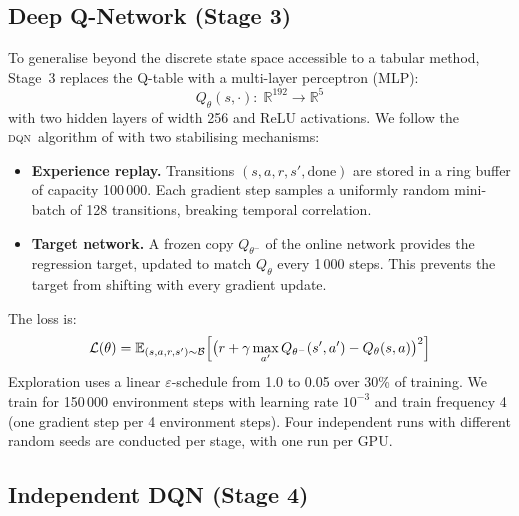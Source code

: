 \documentclass[12pt]{article}
\newcommand{\state}{s}
\newcommand{\action}{a}
\newcommand{\reward}{r}
\newcommand{\discount}{\gamma}
\newcommand{\DQN}{\textsc{dqn}}
\begin{document}
\subsection{Deep Q-Network (Stage 3)}
\label{sec:dqn}

To generalise beyond the discrete state space accessible to a tabular method,
Stage~3 replaces the Q-table with a multi-layer perceptron (MLP):
\begin{equation}
  Q_\theta(\state, \cdot):\; \mathbb{R}^{192} \to \mathbb{R}^5
\end{equation}
with two hidden layers of width 256 and ReLU activations.  We follow the
\DQN\ algorithm of \citet{mnih2015human} with two stabilising
mechanisms:
\begin{itemize}
  \item \textbf{Experience replay.} Transitions $(\state, \action, \reward,
        \state', \text{done})$ are stored in a ring buffer of capacity
        100\,000.  Each gradient step samples a uniformly random mini-batch of
        128 transitions, breaking temporal correlation.
  \item \textbf{Target network.} A frozen copy $Q_{\theta^-}$ of the online
        network provides the regression target, updated to match $Q_\theta$
        every 1\,000 steps.  This prevents the target from shifting with
        every gradient update.
\end{itemize}
The loss is:
\begin{equation}
  \mathcal{L}(\theta) = \mathbb{E}_{(\state,\action,\reward,\state') \sim
    \mathcal{B}} \Bigl[
    \bigl(\reward + \discount \max_{\action'} Q_{\theta^-}(\state', \action')
    - Q_\theta(\state, \action)\bigr)^2
  \Bigr]
  \label{eq:dqn_loss}
\end{equation}
Exploration uses a linear $\varepsilon$-schedule from 1.0 to 0.05 over 30\%
of training.  We train for 150\,000 environment steps with learning rate
$10^{-3}$ and train frequency 4 (one gradient step per 4 environment steps).
Four independent runs with different random seeds are conducted per stage,
with one run per GPU.

\subsection{Independent DQN (Stage 4)}
\label{sec:idqn}
\end{document}

